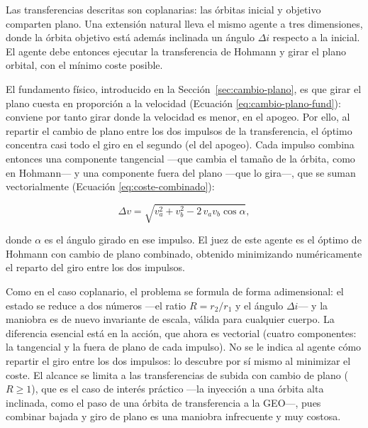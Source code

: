 Las transferencias descritas son coplanarias: las órbitas inicial y objetivo comparten plano. Una extensión natural lleva el mismo agente a tres dimensiones, donde la órbita objetivo está además inclinada un ángulo $\Delta i$ respecto a la inicial. El agente debe entonces ejecutar la transferencia de Hohmann y girar el plano orbital, con el mínimo coste posible.

El fundamento físico, introducido en la Sección~\ref{sec:cambio-plano}, es que girar el plano cuesta en proporción a la velocidad (Ecuación \ref{eq:cambio-plano-fund}): conviene por tanto girar donde la velocidad es menor, en el apogeo. Por ello, al repartir el cambio de plano entre los dos impulsos de la transferencia, el óptimo
concentra casi todo el giro en el segundo (el del apogeo). Cada impulso combina entonces una componente tangencial ---que cambia el tamaño de la órbita, como en Hohmann--- y una componente fuera del plano ---que lo gira---, que se suman vectorialmente (Ecuación \ref{eq:coste-combinado}):

\begin{equation}
  \Delta v = \sqrt{v_a^{2} + v_b^{2} - 2\,v_a v_b \cos\alpha},
  \label{eq:coste-combinado}
\end{equation}

donde $\alpha$ es el ángulo girado en ese impulso. El juez de este agente es el óptimo de Hohmann con cambio de plano combinado, obtenido minimizando numéricamente el reparto del giro entre los dos impulsos.

Como en el caso coplanario, el problema se formula de forma adimensional: el estado se reduce a dos números ---el ratio $R=r_2/r_1$ y el ángulo $\Delta i$--- y la maniobra es de nuevo invariante de escala, válida para cualquier cuerpo. La diferencia
esencial está en la acción, que ahora es vectorial (cuatro componentes: la tangencial y la fuera de plano de cada impulso). No se le indica al agente cómo repartir el giro entre los dos impulsos: lo descubre por sí mismo al minimizar el coste. El alcance se limita a las transferencias de subida con cambio de plano ($R\ge 1$), que es el caso de interés práctico ---la inyección a una órbita alta inclinada, como el paso de una órbita de transferencia a la \gls{GEO}---, pues combinar bajada y giro de plano es una maniobra infrecuente y muy costosa.

